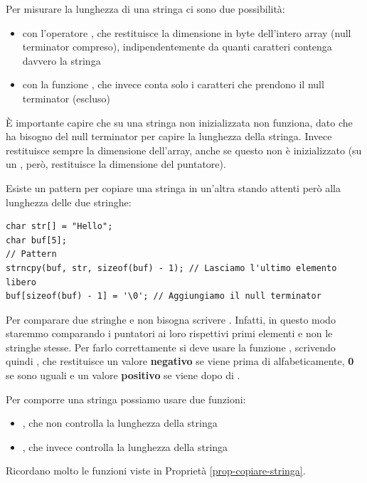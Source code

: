 \documentclass[11pt, a4paper, titlepage, oneside]{scrbook}
\begin{document}
\begin{Proprieta}
\label{prop-misurare-lunghezza-stringa}
Per misurare la lunghezza di una stringa ci sono due possibilità:
\begin{itemize}
    \item con l'operatore , che restituisce la dimensione in byte dell'intero array (null terminator compreso), indipendentemente da quanti caratteri contenga davvero la stringa
    \item con la funzione , che invece conta solo i caratteri che prendono il null terminator (escluso)
\end{itemize}
È importante capire che su una stringa non inizializzata  non funziona, dato che ha bisogno del null terminator per capire la lunghezza della stringa. Invece  restituisce sempre la dimensione dell'array, anche se questo non è inizializzato (su un , però, restituisce la dimensione del puntatore).
\end{Proprieta}

Esiste un pattern per copiare una stringa in un'altra stando attenti però alla lunghezza delle due stringhe:
\begin{lstlisting}[style=C]
char str[] = "Hello";
char buf[5];
// Pattern
strncpy(buf, str, sizeof(buf) - 1); // Lasciamo l'ultimo elemento libero
buf[sizeof(buf) - 1] = '\0'; // Aggiungiamo il null terminator 
\end{lstlisting}

\begin{Proprieta}
\label{prop-comparare-stringhe}
Per comparare due stringhe  e  non bisogna scrivere . Infatti, in questo modo staremmo comparando i puntatori ai loro rispettivi primi elementi e non le stringhe stesse. Per farlo correttamente si deve usare la funzione , scrivendo quindi , che restituisce un valore \textbf{negativo} se  viene prima di  alfabeticamente, \textbf{0} se sono uguali e un valore \textbf{positivo} se  viene dopo di .
\end{Proprieta}

\begin{Proprieta}
\label{prop-comporre-stringa}
Per comporre una stringa possiamo usare due funzioni:
\begin{itemize}
    \item {}, che non controlla la lunghezza della stringa
    \item {}, che invece controlla la lunghezza della stringa
\end{itemize}
Ricordano molto le funzioni viste in Proprietà \ref{prop-copiare-stringa}.
\end{Proprieta}
\end{document}
